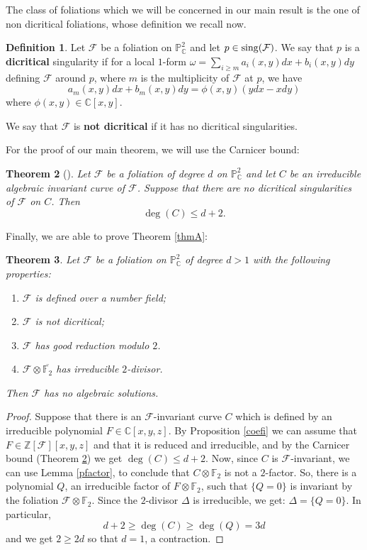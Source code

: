 \documentclass[reqno,oneside,11pt]{amsart}
\newtheorem{thm}{Theorem}[section]
\theoremstyle{definition}
\newtheorem{dfn}[thm]{Definition}
\begin{document}
The class of foliations which we will be concerned in our main result is the one of non dicritical foliations, whose definition we recall now.

\begin{dfn}\label{dfn:dicritical}
    Let $\mathcal{F}$ be a foliation on $\mathbb{P}^2_\mathbb{C}$ and let $p \in {\rm sing}(\mathcal{F})$. We say that $p$ is a \textbf{dicritical} singularity if for a local $1$-form $\omega = \sum_{i \geq m} a_i(x,y) dx + b_i(x,y)dy$ defining $\mathcal{F}$ around $p$, where $m$ is the multiplicity of $\mathcal{F}$ at $p$, we have
    \[ a_m(x,y)dx+b_m(x,y)dy = \phi(x,y)(ydx-xdy)\]
    where $\phi(x,y) \in \mathbb{C}[x,y]$.

    We say that $\mathcal{F}$ is \textbf{not dicritical} if it has no dicritical singularities.
\end{dfn}

For the proof of our main theorem, we will use the Carnicer bound:

\begin{thm}[\cite{MR1298714}]\label{carnicer}
    Let $\mathcal{F}$ be a foliation of degree $d$ on $\mathbb{P}^2_\mathbb{C}$ and let $C$ be an irreducible algebraic invariant curve of $\mathcal{F}$. Suppose that there are no dicritical singularities of $\mathcal{F}$ on $C$. Then
    \[ \deg(C) \leq d + 2.\]
\end{thm}

Finally, we are able to prove Theorem \ref{thmA}:

\begin{thm}\label{main} Let $\mathcal{F}$ be a foliation on $\mathbb{P}_{\mathbb{C}}^{2}$ of degree $d > 1$ with the following properties:
\begin{enumerate}
    \item $\mathcal{F}$ is defined over a number field;
    \item $\mathcal{F}$ is not dicritical;
    \item $\mathcal{F}$ has good reduction modulo $2$. 
    \item $\mathcal{F}\otimes \overline{\mathbb{F}_2}$ has irreducible $2$-divisor.
\end{enumerate}
Then $\mathcal{F}$ has no algebraic solutions.
\end{thm}
\begin{proof} Suppose that there is an $\mathcal{F}$-invariant curve $C$ which is defined by an irreducible polynomial $F \in \mathbb{C}[x,y,z]$. By Proposition \ref{coefi} we can assume that $F \in \mathbb{Z}[\mathcal{F}][x,y,z]$ and that it is reduced  and irreducible, and by the Carnicer bound (Theorem \ref{carnicer}) we get $\deg(C)\leq d+2$. Now, since $C$ is $\mathcal{F}$-invariant, we can use Lemma \ref{pfactor}, to conclude that $C\otimes \mathbb{F}_2$ is not a $2$-factor. So, there is a polynomial $Q$, an irreducible factor of $F\otimes \mathbb{F}_2$, such that $\{Q=0\}$ is invariant by the foliation $\mathcal{F} \otimes \mathbb{F}_2$. Since the $2$-divisor $\Delta$ is irreducible, we get: $\Delta = \{Q = 0\}$. In particular,
$$
    d+2\geq \deg(C)\geq \deg(Q) = 3d
$$
and we get $2\geq 2d$ so that $d = 1$, a contraction.    
\end{proof}
\end{document}
